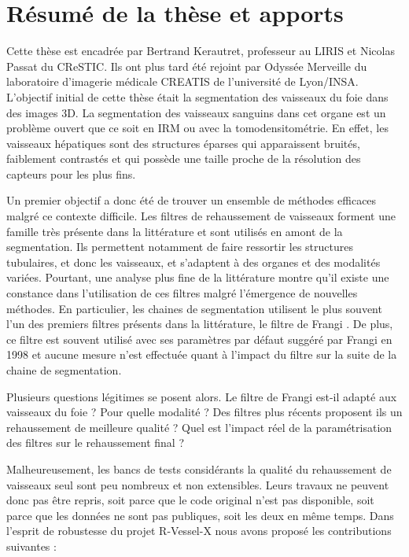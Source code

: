 \section{Résumé de la thèse et apports}
\label{sec:introduction:résumé}

Cette thèse est encadrée par Bertrand Kerautret, professeur au LIRIS et Nicolas Passat du CReSTIC. Ils ont plus tard été rejoint par Odyssée Merveille du laboratoire d'imagerie médicale CREATIS de l'université de Lyon/INSA. L'objectif initial de cette thèse était la segmentation des vaisseaux du foie dans des images 3D. La segmentation des vaisseaux sanguins dans cet organe est un problème ouvert que ce soit en IRM ou avec la tomodensitométrie. En effet, les vaisseaux hépatiques sont des structures éparses qui apparaissent bruités, faiblement contrastés et qui possède une taille proche de la résolution des capteurs pour les plus fins.

Un premier objectif a donc été de trouver un ensemble de méthodes efficaces malgré ce contexte difficile. Les filtres de rehaussement de vaisseaux forment une famille très présente dans la littérature et sont utilisés en amont de la segmentation. Ils permettent notamment de faire ressortir les structures tubulaires, et donc les vaisseaux, et s'adaptent à des organes et des modalités variées. Pourtant, une analyse plus fine de la littérature montre qu'il existe une constance dans l'utilisation de ces filtres malgré l'émergence de nouvelles méthodes. En particulier, les chaines de segmentation utilisent le plus souvent l'un des premiers filtres présents dans la littérature, le filtre de Frangi \cite{Frangi1998_vesselness}. De plus, ce filtre est souvent utilisé avec ses paramètres par défaut suggéré par Frangi en 1998 et aucune mesure n'est effectuée quant à l'impact du filtre sur la suite de la chaine de segmentation.

Plusieurs questions légitimes se posent alors. Le filtre de Frangi est-il adapté aux vaisseaux du foie ? Pour quelle modalité ? Des filtres plus récents proposent ils un rehaussement de meilleure qualité ? Quel est l'impact réel de la paramétrisation des filtres sur le rehaussement final ?

Malheureusement, les bancs de tests considérants la qualité du rehaussement de vaisseaux seul sont peu nombreux et non extensibles. Leurs travaux ne peuvent donc pas être repris, soit parce que le code original n'est pas disponible, soit parce que les données ne sont pas publiques, soit les deux en même temps. Dans l'esprit de robustesse du projet R-Vessel-X nous avons proposé les contributions suivantes :

